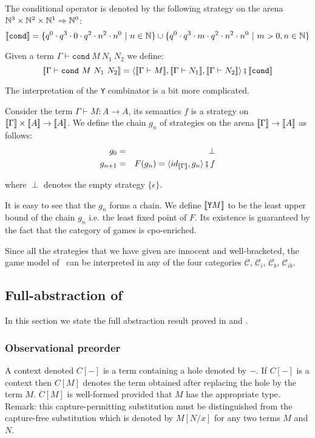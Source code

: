 The conditional operator is denoted by the following strategy on the
arena $\mathbb{N}^3 \times \mathbb{N}^2 \times \mathbb{N} ^1 \Rightarrow \mathbb{N}^0$:
$${[\![ \texttt{cond} ]\!]} =
    \{ q^0 \cdot q^3 \cdot 0 \cdot q^2 \cdot n^2 \cdot n^0 \ | \ n \in \mathbb{N} \}
    \cup
    \{ q^0 \cdot q^3 \cdot m \cdot q^2 \cdot n^2 \cdot n^0 \ | \ m >0, n \in \mathbb{N} \}
    $$


Given a term $\Gamma \vdash \texttt{cond}\ M\ N_1\ N_2$ we define:
$$\sem{\Gamma \vdash \texttt{cond}\ M\ N_1\ N_2} =
\langle \sem{\Gamma \vdash M}, \sem{\Gamma \vdash N_1}, \sem{\Gamma
\vdash N_2} \rangle \fatsemi \sem{\texttt{cond}}$$


The interpretation of the \texttt{Y} combinator is a bit more
complicated.

Consider the term $\Gamma \vdash M : A \rightarrow A$, its semantics
$f$ is a strategy on ${[\![ \Gamma ]\!]} \times {[\![A ]\!]} \rightarrow
{[\![A ]\!]}$. We define the chain $g_n$ of strategies on the arena
${[\![ \Gamma ]\!]} \rightarrow {[\![A ]\!]}$ as follows:
\begin{eqnarray*}
g_0 &=& \perp \\
g_{n+1} &=&  F(g_n) = \langle id_{{[\![ \Gamma ]\!]}}, g_n\rangle \fatsemi f
\end{eqnarray*}

where $\perp$ denotes the empty strategy $\{ \epsilon \}$.

It is easy to see that the $g_n$ forms a chain. We define
${[\![ \texttt{Y} M ]\!]}$ to be the least upper bound of the chain $g_n$
i.e. the  least fixed point of $F$. Its existence is guaranteed by
the fact that the category of games is cpo-enriched.

Since all the strategies that we have given are innocent and
well-bracketed, the game model of \pcf\ can be interpreted in any of
the four categories $\mathcal{C}$, $\mathcal{C}_i$, $\mathcal{C}_b$,
$\mathcal{C}_{ib}$.



\subsection{Full-abstraction of \pcf}
In this section we state the full abstraction result proved in
\cite{abramsky94full} and \cite{hylandong_pcf}.


\subsubsection{Observational preorder}

A context denoted $C[-]$ is a term containing a hole denoted by $-$.
If $C[-]$ is a context then $C[M]$ denotes the term obtained after
replacing the hole by the term $M$. $C[M]$ is well-formed provided
that $M$ has the appropriate type. Remark: this capture-permitting
substitution must be distinguished from the capture-free
substitution which is denoted by $M[N/x]$ for any two terms $M$ and
$N$.

